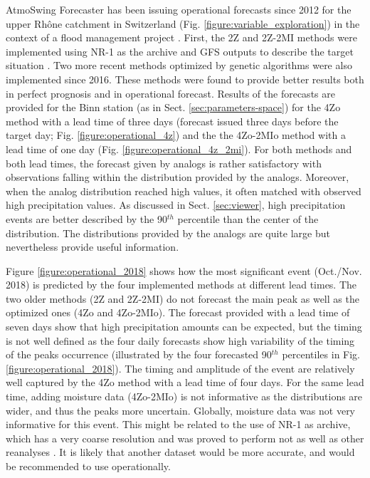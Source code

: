 \documentclass[review]{elsarticle}
\begin{document}
AtmoSwing Forecaster has been issuing operational forecasts since 2012 for the upper Rh\^one catchment in Switzerland (Fig. \ref{figure:variable_exploration}) in the context of a flood management project \citep{GarciaHernandez2009b}. First, the 2Z and 2Z-2MI methods were implemented using NR-1 as the archive and GFS outputs to describe the target situation \citep{Horton2012a}. Two more recent methods optimized by genetic algorithms \citep{Horton2018a} were also implemented since 2016. These methods were found to provide better results both in perfect prognosis and in operational forecast. Results of the forecasts are provided for the Binn station (as in Sect. \ref{sec:parameters-space}) for the 4Zo method with a lead time of three days (forecast issued three days before the target day; Fig. \ref{figure:operational_4z}) and the the 4Zo-2MIo method with a lead time of one day (Fig. \ref{figure:operational_4z_2mi}). For both methods and both lead times, the forecast given by analogs is rather satisfactory with observations falling within the distribution provided by the analogs. Moreover, when the analog distribution reached high values, it often matched with observed high precipitation values. As discussed in Sect. \ref{sec:viewer}, high precipitation events are better described by the 90$^{th}$ percentile than the center of the distribution. The distributions provided by the analogs are quite large but nevertheless provide useful information.

Figure \ref{figure:operational_2018} shows how the most significant event (Oct./Nov. 2018) is predicted by the four implemented methods at different lead times. The two older methods (2Z and 2Z-2MI) do not forecast the main peak as well as the optimized ones (4Zo and 4Zo-2MIo). The forecast provided with a lead time of seven days show that high precipitation amounts can be expected, but the timing is not well defined as the four daily forecasts show high variability of the timing of the peaks occurrence (illustrated by the four forecasted 90$^{th}$ percentiles in Fig. \ref{figure:operational_2018}). The timing and amplitude of the event are relatively well captured by the 4Zo method with a lead time of four days. For the same lead time, adding moisture data (4Zo-2MIo) is not informative as the distributions are wider, and thus the peaks more uncertain. Globally, moisture data was not very informative for this event. This might be related to the use of NR-1 as archive, which has a very coarse resolution and was proved to perform not as well as other reanalyses \citep{Horton2018b}. It is likely that another dataset would be more accurate, and would be recommended to use operationally.
\end{document}
